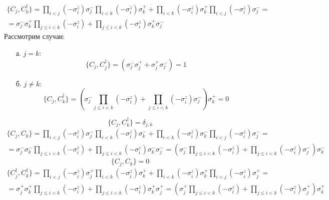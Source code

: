 \documentclass[12pt]{article}
\theoremstyle{definition}
\begin{document}
\begin{enumerate}
\begin{itemize}
\begin{equation}
        \end{equation}
        \begin{multline}
            \{C_j,C^\dagger_k\}=\prod\limits_{i<j}(-\sigma_i^z)\sigma_j^-\prod\limits_{i<k}(-\sigma_i^z)\sigma_k^++\prod\limits_{i<k}(-\sigma_i^z)\sigma_k^+\prod\limits_{i<j}(-\sigma_i^z)\sigma_j^-=\\=\sigma^-_j\sigma^+_k\prod\limits_{j\leq i<k}(-\sigma_i^z)+\prod\limits_{j\leq i<k}(-\sigma_i^z)\sigma^+_k\sigma^-_j
        \end{multline}
        Рассмотрим случаи:
        \begin{itemize}
            \item[а.] $j=k$:
            \begin{equation}
                \{C_j,C^\dagger_j\}=(\sigma^-_j\sigma^+_j+\sigma^+_j\sigma^-_j)=1
            \end{equation}
            \item[б.] $j\neq k$:
            \begin{equation}
                \{C_j,C^\dagger_k\}=\left(\sigma^-_j\prod\limits_{j\leq i<k}(-\sigma_i^z)+\prod\limits_{j\leq i<k}(-\sigma_i^z)\sigma^-_j\right)\sigma^+_k=0
            \end{equation}
        \end{itemize}
        \begin{equation}
            \boxed{\{C_j,C^\dagger_k\}=\delta_{j,k}}
        \end{equation}
        \begin{multline}
            \{C_j,C_k\}=\prod\limits_{i<j}(-\sigma_i^z)\sigma_j^-\prod\limits_{i<k}(-\sigma_i^z)\sigma_k^-+\prod\limits_{i<k}(-\sigma_i^z)\sigma_k^-\prod\limits_{i<j}(-\sigma_i^z)\sigma_j^-=\\=\sigma^-_j\sigma^-_k\prod\limits_{j\leq i<k}(-\sigma_i^z)+\prod\limits_{j\leq i<k}(-\sigma_i^z)\sigma^-_k\sigma^-_j=\left(\sigma^-_j\prod\limits_{j\leq i<k}(-\sigma_i^z)+\prod\limits_{j\leq i<k}(-\sigma_i^z)\sigma^-_j\right)\sigma^-_k
        \end{multline}
        \begin{equation}
            \boxed{\{C_j,C_k\}=0}
        \end{equation}
        \begin{multline}
            \{C^\dagger_j,C^\dagger_k\}=\prod\limits_{i<j}(-\sigma_i^z)\sigma_j^+\prod\limits_{i<k}(-\sigma_i^z)\sigma_k^++\prod\limits_{i<k}(-\sigma_i^z)\sigma_k^+\prod\limits_{i<j}(-\sigma_i^z)\sigma_j^+=\\=\sigma^+_j\sigma^+_k\prod\limits_{j\leq i<k}(-\sigma_i^z)+\prod\limits_{j\leq i<k}(-\sigma_i^z)\sigma^+_k\sigma^+_j=\left(\sigma^+_j\prod\limits_{j\leq i<k}(-\sigma_i^z)+\prod\limits_{j\leq i<k}(-\sigma_i^z)\sigma^+_j\right)\sigma^+_k

\end{multline}
\end{itemize}
\end{enumerate}
\end{document}
